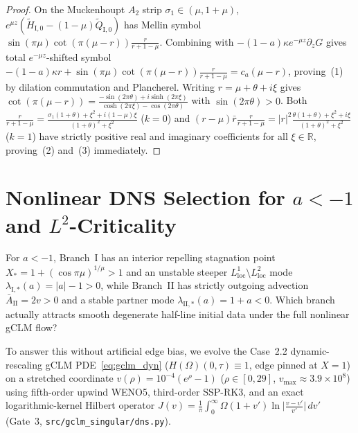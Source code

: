 \documentclass[11pt,a4paper]{article}
\begin{document}
\begin{proof}
On the Muckenhoupt $A_2$ strip $\sigma_1 \in (\mu, 1+\mu)$, $e^{\mu z}(\widetilde{H}_{\mathrm{I},0} - (1-\mu)\widetilde{Q}_{\mathrm{I},0})$ has Mellin symbol $\sin(\pi\mu)\cot(\pi(\mu-r))\frac{r}{r+1-\mu}$. Combining with $-(1-a)\kappa e^{-\mu z}\partial_z G$ gives total $e^{-\mu z}$-shifted symbol $-(1-a)\kappa r + \sin(\pi\mu)\cot(\pi(\mu-r))\frac{r}{r+1-\mu} = c_a(\mu-r)$, proving~(1) by dilation commutation and Plancherel. Writing $r = \mu + \theta + i\xi$ gives $\cot(\pi(\mu-r)) = \frac{-\sin(2\pi\theta) + i\sinh(2\pi\xi)}{\cosh(2\pi\xi) - \cos(2\pi\theta)}$ with $\sin(2\pi\theta) > 0$. Both $\frac{r}{r+1-\mu} = \frac{\sigma_1(1+\theta)+\xi^2 + i(1-\mu)\xi}{(1+\theta)^2+\xi^2}$ ($k=0$) and $(r-\mu)\bar r\frac{r}{r+1-\mu} = |r|^2\frac{\theta(1+\theta)+\xi^2 + i\xi}{(1+\theta)^2+\xi^2}$ ($k=1$) have strictly positive real and imaginary coefficients for all $\xi \in \mathbb{R}$, proving~(2) and~(3) immediately.
\end{proof}

\section{Nonlinear DNS Selection for \texorpdfstring{$a < -1$}{a < -1} and \texorpdfstring{$L^2$}{L2}-Criticality}\label{sec:dns}

For $a < -1$, Branch~I has an interior repelling stagnation point $X_* = 1 + (\cos\pi\mu)^{1/\mu} > 1$ and an unstable steeper $L^1_{\mathrm{loc}}\setminus L^2_{\mathrm{loc}}$ mode $\lambda_{\mathrm{I},*}(a) = |a|-1 > 0$, while Branch~II has strictly outgoing advection $\bar A_{\mathrm{II}} = 2v > 0$ and a stable partner mode $\lambda_{\mathrm{II},*}(a) = 1+a < 0$. Which branch actually attracts smooth degenerate half-line initial data under the full nonlinear gCLM flow?

To answer this without artificial edge bias, we evolve the Case~2.2 dynamic-rescaling gCLM PDE~\eqref{eq:gclm_dyn} ($H(\Omega)(0,\tau) \equiv 1$, edge pinned at $X = 1$) on a stretched coordinate $v(\rho) = 10^{-4}(e^\rho - 1)$ ($\rho \in [0, 29]$, $v_{\max} \approx 3.9\times 10^8$) using fifth-order upwind WENO5, third-order SSP-RK3, and an exact logarithmic-kernel Hilbert operator $J(v) = \frac{1}{\pi}\int_0^\infty \Omega(1+v')\ln\big|\frac{v-v'}{v'}\big|\,dv'$ (Gate~3, \texttt{src/gclm\_singular/dns.py}).
\end{document}
